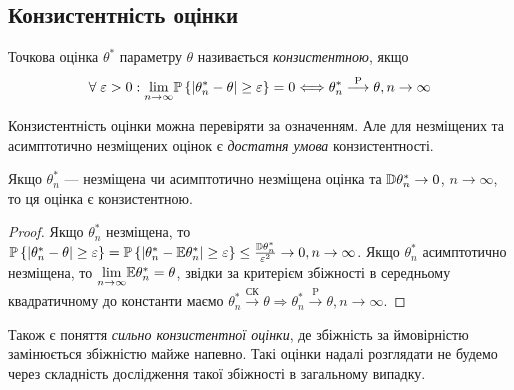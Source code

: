 \subsection{Конзистентність оцінки}
\begin{definition}
    Точкова оцінка $\theta^*$ параметру $\theta$ називається \emph{конзистентною}, якщо
    \begin{gather}\label{estim_consis}
        \forall \; \varepsilon > 0: \underset{n \to \infty}{\lim} \P\left\{|\theta^*_n - \theta| \geq \varepsilon\right\}= 0
        \Longleftrightarrow \theta^*_n \overset{\mathrm{P}}{\longrightarrow} \theta, n \to \infty
    \end{gather}
\end{definition}
Конзистентність оцінки можна перевіряти за означенням. Але для незміщених та асимптотично незміщених оцінок є
\emph{достатня умова} конзистентності.
\begin{proposition*}
    Якщо $\theta^*_n$ --- незміщена чи асимптотично незміщена оцінка та $\D\theta^*_n \to 0$, $n \to \infty$,
    то ця оцінка є конзистентною.
\end{proposition*}
\begin{proof}
    Якщо $\theta^*_n$ незміщена, то 
    $\P\left\{|\theta^*_n - \theta| \geq \varepsilon\right\}=\P\left\{|\theta^*_n - \E\theta^*_n| \geq \varepsilon\right\} 
    \leq \frac{\D\theta^*_n}{\varepsilon^2} \to 0, n\to \infty$.
    Якщо $\theta^*_n$ асимптотично незміщена, то $\underset{n\to\infty}{\lim} \E\theta^*_n = \theta$,
    звідки за критерієм збіжності в середньому квадратичному до константи маємо 
    $\theta^*_n \overset{\text{СК}}{\longrightarrow} \theta \Rightarrow \theta^*_n \overset{\mathrm{P}}{\longrightarrow} \theta, n\to\infty$.
\end{proof}
\begin{remark}
    Також є поняття \emph{сильно конзистентної оцінки}, де збіжність за ймовірністю замінюється збіжністю майже напевно.
    Такі оцінки надалі розглядати не будемо через складність дослідження такої збіжності в загальному випадку. 
\end{remark}
